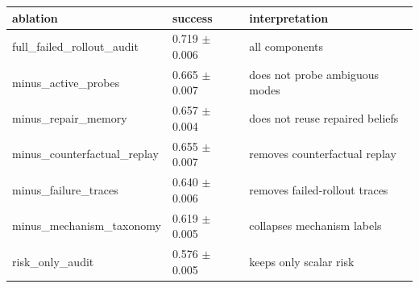 \begin{tabular}{lll}
\toprule
ablation & success & interpretation \\
\midrule
full\_failed\_rollout\_audit & 0.719 $\pm$ 0.006 & all components \\
minus\_active\_probes & 0.665 $\pm$ 0.007 & does not probe ambiguous modes \\
minus\_repair\_memory & 0.657 $\pm$ 0.004 & does not reuse repaired beliefs \\
minus\_counterfactual\_replay & 0.655 $\pm$ 0.007 & removes counterfactual replay \\
minus\_failure\_traces & 0.640 $\pm$ 0.006 & removes failed-rollout traces \\
minus\_mechanism\_taxonomy & 0.619 $\pm$ 0.005 & collapses mechanism labels \\
risk\_only\_audit & 0.576 $\pm$ 0.005 & keeps only scalar risk \\
\bottomrule
\end{tabular}
